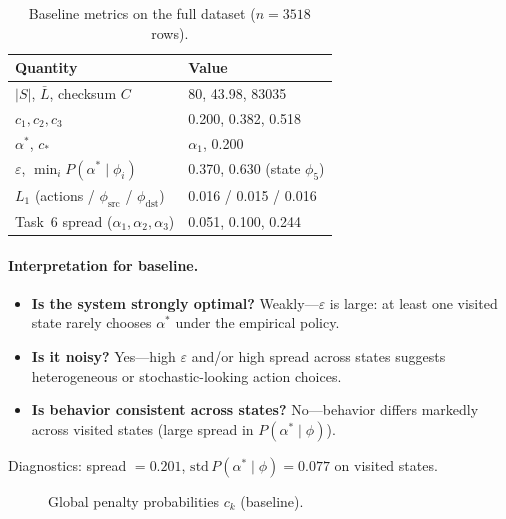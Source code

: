 \documentclass[11pt,a4paper]{article}
\begin{document}
\begin{table}[htbp]
  \centering
  \caption{Baseline metrics on the full dataset ($n=3518$ rows).}
  \label{tab:baseline-metrics}
  \begin{tabular}{@{}ll@{}}
    \toprule
    \textbf{Quantity} & \textbf{Value} \\
    \midrule
    $|S|$, $\bar{L}$, checksum $C$ & 80, 43.98, 83035 \\
    $c_1,c_2,c_3$ & 0.200, 0.382, 0.518 \\
    $\alpha^\ast$, $c_\ast$ & $\alpha_1$, 0.200 \\
    $\varepsilon$, $\min_i P(\alpha^\ast\mid\phi_i)$ & 0.370, 0.630 (state $\phi_5$) \\
    $L_1$ (actions / $\phi_{\mathrm{src}}$ / $\phi_{\mathrm{dst}}$) & 0.016 / 0.015 / 0.016 \\
    Task~6 spread ($\alpha_1,\alpha_2,\alpha_3$) & 0.051, 0.100, 0.244 \\
    \bottomrule
  \end{tabular}
\end{table}

\paragraph{Interpretation for baseline.}
\begin{itemize}[noitemsep]
  \item \textbf{Is the system strongly optimal?}
        Weakly---$\varepsilon$ is large: at least one visited state rarely chooses
        $\alpha^\ast$ under the empirical policy.
  \item \textbf{Is it noisy?}
        Yes---high $\varepsilon$ and/or high spread across states suggests
        heterogeneous or stochastic-looking action choices.
  \item \textbf{Is behavior consistent across states?}
        No---behavior differs markedly across visited states (large spread in
        $P(\alpha^\ast\mid\phi)$).
\end{itemize}
\noindent Diagnostics: spread $=0.201$, $\mathrm{std}\,P(\alpha^\ast\mid\phi)=0.077$ on
visited states.

\begin{figure}[H]
  \centering
  \caption{Global penalty probabilities $c_k$ (baseline).}
  \label{fig:ck-baseline}
\end{figure}
\end{document}
